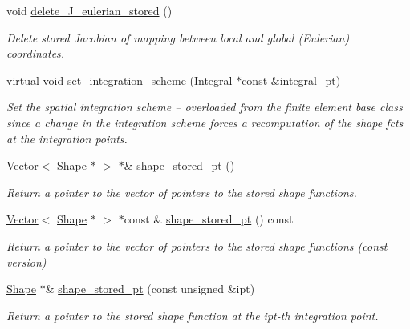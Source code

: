 \begin{DoxyCompactItemize}
void \hyperlink{classoomph_1_1StorableShapeElementBase_ab9e219f5624ced52f74ca4fefc2f711b}{delete\+\_\+\+J\+\_\+eulerian\+\_\+stored} ()
\begin{DoxyCompactList}\small\item\em Delete stored Jacobian of mapping between local and global (Eulerian) coordinates. \end{DoxyCompactList}\item 
virtual void \hyperlink{classoomph_1_1StorableShapeElementBase_a1c20f4028654ec94f57037a3e3dc6582}{set\+\_\+integration\+\_\+scheme} (\hyperlink{classoomph_1_1Integral}{Integral} $\ast$const \&\hyperlink{classoomph_1_1FiniteElement_a751dc02ff1325f799840d79ee415753a}{integral\+\_\+pt})
\begin{DoxyCompactList}\small\item\em Set the spatial integration scheme -- overloaded from the finite element base class since a change in the integration scheme forces a recomputation of the shape fcts at the integration points. \end{DoxyCompactList}\item 
\hyperlink{classoomph_1_1Vector}{Vector}$<$ \hyperlink{classoomph_1_1Shape}{Shape} $\ast$ $>$ $\ast$\& \hyperlink{classoomph_1_1StorableShapeElementBase_a5566712150a548f9a9390c56e21d96c7}{shape\+\_\+stored\+\_\+pt} ()
\begin{DoxyCompactList}\small\item\em Return a pointer to the vector of pointers to the stored shape functions. \end{DoxyCompactList}\item 
\hyperlink{classoomph_1_1Vector}{Vector}$<$ \hyperlink{classoomph_1_1Shape}{Shape} $\ast$ $>$ $\ast$const  \& \hyperlink{classoomph_1_1StorableShapeElementBase_a17084430eb55019882cde322f01874a3}{shape\+\_\+stored\+\_\+pt} () const
\begin{DoxyCompactList}\small\item\em Return a pointer to the vector of pointers to the stored shape functions (const version) \end{DoxyCompactList}\item 
\hyperlink{classoomph_1_1Shape}{Shape} $\ast$\& \hyperlink{classoomph_1_1StorableShapeElementBase_ab5f825cab04717ff08220a6b1fb754a3}{shape\+\_\+stored\+\_\+pt} (const unsigned \&ipt)
\begin{DoxyCompactList}\small\item\em Return a pointer to the stored shape function at the ipt-\/th integration point. \end{DoxyCompactList}\item 

\end{DoxyCompactItemize}
